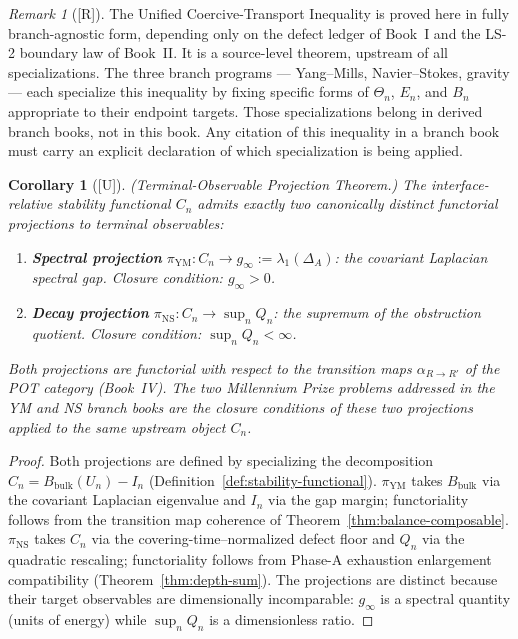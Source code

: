 \documentclass[12pt,oneside]{amsbook}
\theoremstyle{plain}
\newtheorem{corollary}[theorem]{Corollary}
\theoremstyle{definition}
\theoremstyle{remark}
\newtheorem{remark}[theorem]{Remark}
\newcommand{\status}[1]{\textup{[#1]}}
\begin{document}
\begin{remark}[\status{R}]\label{rmk:ineq-branch-agnostic}
The Unified Coercive-Transport Inequality is proved here in fully
branch-agnostic form, depending only on the defect ledger of Book~I
and the LS-2 boundary law of Book~II.  It is a source-level theorem,
upstream of all specializations.  The three branch programs ---
Yang--Mills, Navier--Stokes, gravity --- each specialize this
inequality by fixing specific forms of $\Theta_n$, $E_n$, and $B_n$
appropriate to their endpoint targets.  Those specializations belong
in derived branch books, not in this book.  Any citation of this
inequality in a branch book must carry an explicit declaration of
which specialization is being applied.
\end{remark}
\begin{corollary}[\status{U}]\label{cor:terminal-observable-projection}
\textup{(Terminal-Observable Projection Theorem.)}
The interface-relative stability functional $C_n$ admits exactly two
canonically distinct functorial projections to terminal observables:
\begin{enumerate}[label=\textup{(\roman*)}]
  \item \textbf{Spectral projection} $\pi_{\mathrm{YM}} \colon C_n
    \to g_\infty := \lambda_1(\Delta_A)$: the covariant Laplacian
    spectral gap.  Closure condition: $g_\infty > 0$.
  \item \textbf{Decay projection} $\pi_{\mathrm{NS}} \colon C_n
    \to \sup_n Q_n$: the supremum of the obstruction quotient.
    Closure condition: $\sup_n Q_n < \infty$.
\end{enumerate}
Both projections are functorial with respect to the transition maps
$\alpha_{R \to R'}$ of the POT category (Book~IV).  The two Millennium
Prize problems addressed in the YM and NS branch books are the
closure conditions of these two projections applied to the same
upstream object $C_n$.
\end{corollary}

\begin{proof}
Both projections are defined by specializing the decomposition
$C_n = B_{\mathrm{bulk}}(U_n) - I_n$ (Definition~\ref{def:stability-functional}).
$\pi_{\mathrm{YM}}$ takes $B_{\mathrm{bulk}}$ via the covariant
Laplacian eigenvalue and $I_n$ via the gap margin; functoriality
follows from the transition map coherence of
Theorem~\ref{thm:balance-composable}.  $\pi_{\mathrm{NS}}$ takes
$C_n$ via the covering-time--normalized defect floor and $Q_n$ via
the quadratic rescaling; functoriality follows from Phase-A exhaustion
enlargement compatibility (Theorem~\ref{thm:depth-sum}).  The
projections are distinct because their target observables are
dimensionally incomparable: $g_\infty$ is a spectral quantity
(units of energy) while $\sup_n Q_n$ is a dimensionless ratio.
\end{proof}
\end{document}
